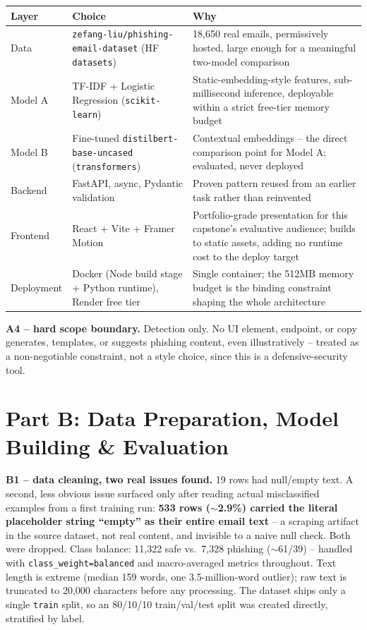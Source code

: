 \documentclass[11pt,a4paper]{article}
\begin{document}
\begin{table}[H]
\centering
\small
\begin{tabular}{@{}p{2.6cm}p{4.3cm}p{7.2cm}@{}}
\toprule
\textbf{Layer} & \textbf{Choice} & \textbf{Why} \\
\midrule
Data & \texttt{zefang-liu/\allowbreak phishing-email-dataset} (HF \texttt{datasets}) & 18{,}650 real emails, permissively hosted, large enough for a meaningful two-model comparison \\[0.3em]
Model A & TF-IDF + Logistic Regression (\texttt{scikit-learn}) & Static-embedding-style features, sub-millisecond inference, deployable within a strict free-tier memory budget \\[0.3em]
Model B & Fine-tuned \texttt{distilbert-base-\allowbreak uncased} (\texttt{transformers}) & Contextual embeddings -- the direct comparison point for Model A; evaluated, never deployed \\[0.3em]
Backend & FastAPI, async, Pydantic validation & Proven pattern reused from an earlier task rather than reinvented \\[0.3em]
Frontend & React + Vite + Framer Motion & Portfolio-grade presentation for this capstone's evaluative audience; builds to static assets, adding no runtime cost to the deploy target \\[0.3em]
Deployment & Docker (Node build stage + Python runtime), Render free tier & Single container; the 512MB memory budget is the binding constraint shaping the whole architecture \\
\bottomrule
\end{tabular}
\end{table}

\textbf{A4 -- hard scope boundary.} Detection only. No UI element, endpoint, or copy
generates, templates, or suggests phishing content, even illustratively -- treated as a
non-negotiable constraint, not a style choice, since this is a defensive-security tool.

\section*{Part B: Data Preparation, Model Building \& Evaluation}

\textbf{B1 -- data cleaning, two real issues found.} 19 rows had null/empty text. A second,
less obvious issue surfaced only after reading actual misclassified examples from a first
training run: \textbf{533 rows ($\sim$2.9\%) carried the literal placeholder string
``empty'' as their entire email text} -- a scraping artifact in the source dataset, not real
content, and invisible to a naive null check. Both were dropped. Class balance: 11{,}322
safe vs.\ 7{,}328 phishing ($\sim$61/39) -- handled with \texttt{class\_weight=balanced} and
macro-averaged metrics throughout. Text length is extreme (median 159 words, one
3.5-million-word outlier); raw text is truncated to 20{,}000 characters before any
processing. The dataset ships only a single \texttt{train} split, so an 80/10/10
train/val/test split was created directly, stratified by label.
\end{document}
